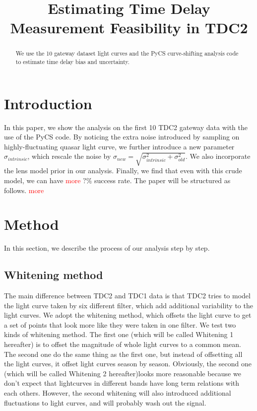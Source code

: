 \documentclass[\docopts]{\docclass}
\begin{document}
\title{ Estimating Time Delay Measurement Feasibility in TDC2 }

\maketitlepre

\begin{abstract}

We use the 10 gateway dataset light curves and the PyCS curve-shifting analysis code to estimate time delay bias and uncertainty.

\end{abstract}


\maketitlepost

% 

\section{Introduction}
\label{sec:intro}

In this paper, we show the analysis on the first 10 TDC2 gateway data with the use of the PyCS code.
By noticing the extra noise introduced by sampling on highly-fluctuating quasar light curve, we further introduce a new parameter $\sigma_{intrinsic}$, which rescale the noise by $\sigma_{new}=\sqrt{\sigma_{intrinsic}^2+\sigma_{old}^2}$. We also incorporate the lens model prior in our analysis.  Finally, we find that even with this crude model, we can have \textcolor{red}{more} $? \%$ success rate. 
The paper will be structured as follows.  \textcolor{red}{more}

\section{Method}
\label{sec:method}
In this section, we describe the process of our analysis step by step. 
\subsection{Whitening method}
The main difference between TDC2 and TDC1 data is that TDC2 tries to model the light curve taken by six different filter, which add additional variability to the light curves. We adopt the whitening method, which offsets the light curve to get a set of points that look more like they were taken in one filter. We test two kinds of whitening method. The first one (which will be called Whitening 1 hereafter) is to offset  the magnitude of whole light curves to a common mean. The second one do the same thing as the first one, but instead of offsetting all the light curves, it offset light curves season by season. Obviously, the second one (which will be called Whitening 2 hereafter)looks more reasonable because we don't expect that lightcurves in different bands have long term relations with each others. However, the second whitening will also introduced additional fluctuations to light curves, and will probably wash out the signal.  
\end{document}
